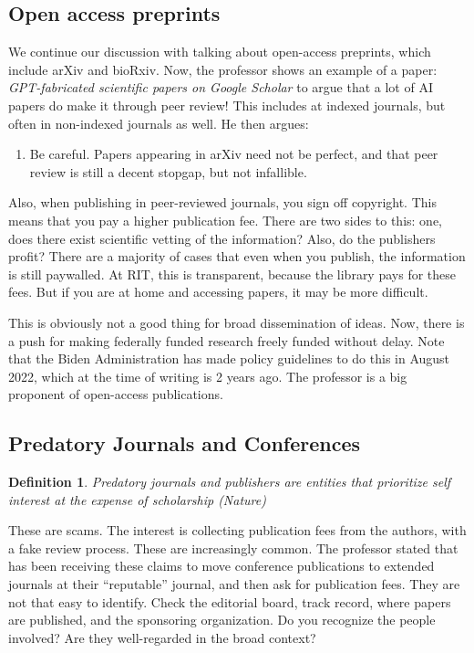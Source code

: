 \documentclass[10pt, oneside]{article}
\newtheorem{defn}{Definition}
\begin{document}
\subsection{Open access preprints}
We continue our discussion with talking about open-access preprints, which include arXiv and bioRxiv. Now, the professor shows an example of a paper: \textit{GPT-fabricated scientific papers on Google Scholar} to argue that a lot of AI papers do make it through peer review! This includes at indexed journals, but often in non-indexed journals as well. He then argues:
\begin{enumerate}
    \item Be careful. Papers appearing in arXiv need not be perfect, and that peer review is still a decent stopgap, but not infallible.
\end{enumerate}

Also, when publishing in peer-reviewed journals, you sign off copyright. This means that you pay a higher publication fee. There are two sides to this: one, does there exist scientific vetting of the information? Also, do the publishers profit? There are a majority of cases that even when you publish, the information is still paywalled. At RIT, this is transparent, because the library pays for these fees. But if you are at home and accessing papers, it may be more difficult. 

This is obviously not a good thing for broad dissemination of ideas. Now, there is a push for making federally funded research freely funded without delay. Note that the Biden Administration has made policy guidelines to do this in August 2022, which at the time of writing is 2 years ago. The professor is a big proponent of open-access publications.
\subsection{Predatory Journals and Conferences}
\begin{defn}
    Predatory journals and publishers are entities that prioritize self interest at the expense of scholarship (Nature)
\end{defn}
These are scams. The interest is collecting publication fees from the authors, with a fake review process. These are increasingly common. The professor stated that has been receiving these claims to move conference publications to extended journals at their ``reputable'' journal, and then ask for publication fees. They are not that easy to identify. Check the editorial board, track record, where papers are published, and the sponsoring organization. Do you recognize the people involved? Are they well-regarded in the broad context?
\end{document}
